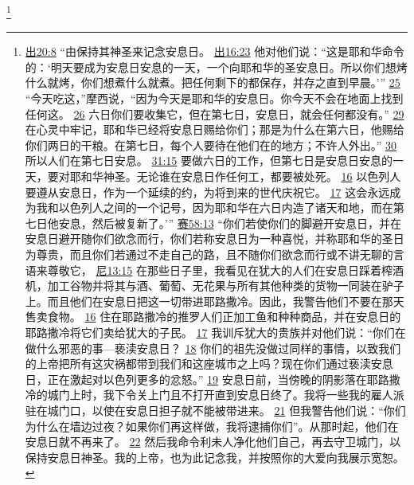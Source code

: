 \documentclass[12pt, a4paper, oneside]{ctexart}
\begin{document}
	\footnote {
		\href{https://biblehub.com/exodus/20-8.htm}{出20:8} “由保持其神圣来记念安息日。
		\href{https://biblehub.com/exodus/16-23.htm}{出16:23} 他对他们说：“这是耶和华命令的：‘明天要成为安息日安息的一天，一个向耶和华的圣安息日。所以你们想烤什么就烤，你们想煮什么就煮。把任何剩下的都保存，并存之直到早晨。’”
		\href{https://biblehub.com/exodus/16-25.htm}{25} “今天吃这，”摩西说，“因为今天是耶和华的安息日。你今天不会在地面上找到任何这。
		\href{https://biblehub.com/exodus/16-26.htm}{26} 六日你们要收集它，但在第七日，安息日，就会任何都没有。”
		\href{https://biblehub.com/exodus/16-29.htm}{29} 在心灵中牢记，耶和华已经将安息日赐给你们；那是为什么在第六日，他赐给你们两日的干粮。在第七日，每个人要待在他们在的地方；不许人外出。”
		\href{https://biblehub.com/exodus/16-30.htm}{30} 所以人们在第七日安息。
		\href{https://biblehub.com/exodus/31-15.htm}{31:15} 要做六日的工作，但第七日是安息日安息的一天，要对耶和华神圣。无论谁在安息日作任何工，都要被处死。
		\href{https://biblehub.com/exodus/31-16.htm}{16} 以色列人要遵从安息日，作为一个延续的约，为将到来的世代庆祝它。
		\href{https://biblehub.com/exodus/31-17.htm}{17} 这会永远成为我和以色列人之间的一个记号，因为耶和华在六日内造了诸天和地，而在第七日他安息，然后被复新了。’”
		\href{https://biblehub.com/isaiah/58-13.htm}{赛58:13} “你们若使你们的脚避开安息日，并在安息日避开随你们欲念而行，你们若称安息日为一种喜悦，并称耶和华的圣日为尊贵，而且你们若通过不走自己的路，且不随你们欲念而行或不讲无聊的言语来尊敬它，
		\href{https://biblehub.com/nehemiah/13-15.htm}{尼13:15} 在那些日子里，我看见在犹大的人们在安息日踩着榨酒机，加工谷物并将其与酒、葡萄、无花果与所有其他种类的货物一同装在驴子上。而且他们在安息日把这一切带进耶路撒冷。因此，我警告他们不要在那天售卖食物。
		\href{https://biblehub.com/nehemiah/13-16.htm}{16} 住在耶路撒冷的推罗人们正加工鱼和种种商品，并在安息日的耶路撒冷将它们卖给犹大的子民。
		\href{https://biblehub.com/nehemiah/13-17.htm}{17} 我训斥犹大的贵族并对他们说：“你们在做什么邪恶的事---亵渎安息日？
		\href{https://biblehub.com/nehemiah/13-18.htm}{18} 你们的祖先没做过同样的事情，以致我们的上帝把所有这灾祸都带到我们和这座城市之上吗？现在你们通过亵渎安息日，正在激起对以色列更多的忿怒。”
		\href{https://biblehub.com/nehemiah/13-19.htm}{19} 安息日前，当傍晚的阴影落在耶路撒冷的城门上时，我下令关上门且不打开直到安息日终了。我将一些我的雇人派驻在城门口，以使在安息日担子就不能被带进来。
		\href{https://biblehub.com/nehemiah/13-21.htm}{21} 但我警告他们说：“你们为什么在墙边过夜？如果你们再这样做，我将逮捕你们”。从那时起，他们在安息日就不再来了。
		\href{https://biblehub.com/nehemiah/13-22.htm}{22} 然后我命令利未人净化他们自己，再去守卫城门，以保持安息日神圣。我的上帝，也为此记念我，并按照你的大爱向我展示宽恕。
	}
\end{document}

